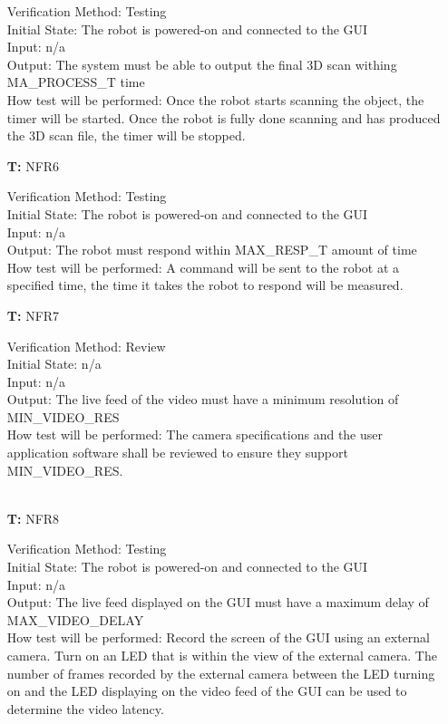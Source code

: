 \documentclass[12pt, titlepage]{article}
\newcounter{tnum} %
\begin{document}
\begin{itemize}
Verification Method: Testing	\\				
Initial State: The robot is powered-on and connected to the GUI	\\			
Input: n/a\\
Output: The system must be able to output the final 3D scan withing MA\_PROCESS\_T time \\
How test will be performed: Once the robot starts scanning the object, the timer will be started. Once the robot is fully done scanning and has produced the 3D scan file, the timer will be stopped. \\

\item[\textbf{T\refstepcounter{tnum}\thetnum:}]{NFR6\\}

Verification Method: Testing	\\				
Initial State: The robot is powered-on and connected to the GUI\\	
Input: n/a\\
Output: The robot must respond within MAX\_RESP\_T amount of time \\
How test will be performed: A command will be sent to the robot at a specified time, the time it takes the robot to respond will be measured.

\item[\textbf{T\refstepcounter{tnum}\thetnum:}]{NFR7\\}

Verification Method: Review	\\				
Initial State: n/a	\\			
Input: n/a\\
Output: The live feed of the video must have a minimum resolution of  MIN\_VIDEO\_RES \\
How test will be performed: The camera specifications and the user application software shall be reviewed to ensure they support MIN\_VIDEO\_RES.\\ \\

\item[\textbf{T\refstepcounter{tnum}\thetnum:}]{NFR8\\}

Verification Method: Testing	\\				
Initial State: The robot is powered-on and connected to the GUI\\			
Input: n/a\\
Output: The live feed displayed on the GUI must have a maximum delay of MAX\_VIDEO\_DELAY \\
How test will be performed: Record the screen of the GUI using an external camera. Turn on an LED that is within the view of the external camera. The number of frames recorded by the external camera between the LED turning on and the LED displaying on the video feed of the GUI can be used to determine the video latency.

\end{itemize}
\end{document}
